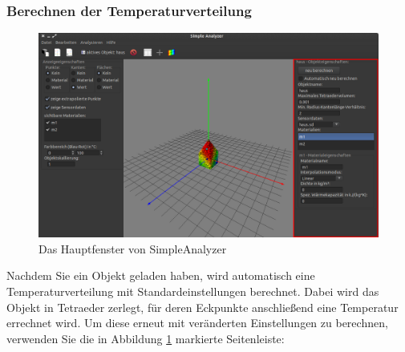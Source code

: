 \documentclass[10pt,a5paper,twoside,titlepage]{scrartcl}
\begin{document}
	\subsubsection{Berechnen der Temperaturverteilung}
	\label{subsec:temp_vert}
	\begin{figure}
	\centering
	\includegraphics[trim=0cm 0cm 0cm 0cm,clip=true,scale=.2]{Simple_Analyzer_objprops.png}
	\caption{Das Hauptfenster von SimpleAnalyzer}
	\label{fig:sa_objprops}
	\end{figure}
	Nachdem Sie ein Objekt geladen haben, wird automatisch eine Temperaturverteilung mit Standardeinstellungen berechnet. Dabei wird das Objekt in Tetraeder zerlegt, für deren Eckpunkte anschließend eine Temperatur errechnet wird. Um diese erneut mit veränderten Einstellungen zu berechnen, verwenden Sie die in Abbildung \ref{fig:sa_objprops} markierte Seitenleiste:
\end{document}
